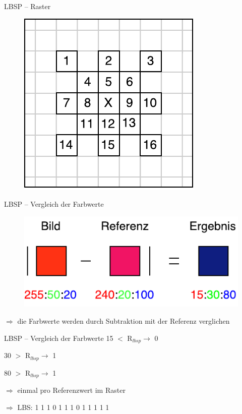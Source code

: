\documentclass[hyperref={pdfpagelabels=false}]{beamer}
\begin{document}
\begin{frame}[t]{LBSP -- Raster}
	\centering
	\begin{figure}
		\centering
		\includegraphics[width=0.45\linewidth]{Abbildungen/Grid.pdf}
		\label{fig:Abbildungen/Grid}
	\end{figure}

\end{frame}

\begin{frame}[t]{LBSP -- Vergleich der Farbwerte}
	\bigskip
	\bigskip
	\bigskip

	\begin{figure}
		\centering
		\includegraphics[width=0.6\linewidth]{Abbildungen/Farb_Vergleich2.pdf}
		\label{fig:Abbildungen/Grid}
	\end{figure}
	\centering
	\bigskip
	$\Rightarrow$ die Farbwerte werden durch Subtraktion mit der Referenz verglichen
\end{frame}


\begin{frame}[t]{LBSP -- Vergleich der Farbwerte}
	\centering
	\bigskip
	\bigskip
	\bigskip
	\color{red}
	15 $<$ R$_{lbsp} \rightarrow$ 0

	\bigskip
	\color{green}
	30 $>$ R$_{lbsp} \rightarrow$ 1
	
	\bigskip
	\color{blue}
	80 $>$ R$_{lbsp} \rightarrow$ 1

	\color{black}
	\bigskip
	\bigskip
	$\Rightarrow$ einmal pro Referenzwert im Raster
	\bigskip
	
	$\Rightarrow$ LBS: 1 1 1 0 1 1 1 0 1 1 1 1 1

\end{frame}
\end{document}
